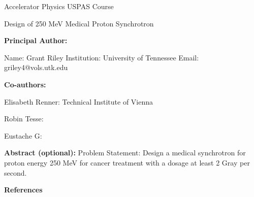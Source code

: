 \documentclass[12pt]{article}
\begin{document}
\raggedright
\huge
Accelerator Physics USPAS Course \linebreak

Design of 250 MeV Medical Proton Synchrotron \linebreak
\normalsize


\textbf{Principal Author:}

Name: Grant Riley
\linebreak           
Institution:  University of Tennessee
\linebreak
Email: griley4@vols.utk.edu
\linebreak

\textbf{Co-authors:}

Elisabeth Renner: Technical Institute of Vienna

Robin Tesse:

Eustache G: 
\linebreak

\textbf{Abstract  (optional):}
Problem Statement: Design a medical synchrotron for proton energy 250 MeV for cancer treatment with a dosage
at least 2 Gray per second.  

\pagebreak


\pagebreak
\textbf{References}
\end{document}
